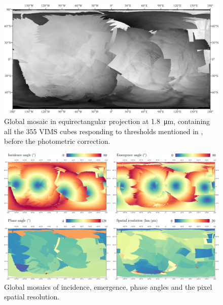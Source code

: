 \documentclass{arxiv-icarus}
\begin{document}
\begin{figure}[!ht]
    \includegraphics[width=.9\linewidth]{Fig_1}
    \caption{Global mosaic in equirectangular projection at \SI{1.8}{\um}, containing all the 355 VIMS cubes responding to thresholds mentioned in , before the photometric correction.}
    \label{fig:fig_1}
\end{figure}

\begin{figure}[!ht]
    \vspace{.25cm}
    \includegraphics[width=.9\linewidth]{Fig_2}
    \caption{Global mosaics of incidence, emergence, phase angles and the pixel spatial resolution.}
    \label{fig:fig_2}
\end{figure}
\end{document}
